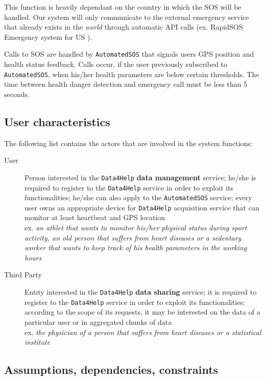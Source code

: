       This function is heavily dependant on the country in which the SOS will be handled. Our system will only communicate to the external emergency service that already exists in the \textit{world} through automatic API calls (ex. RapidSOS Emergency system for US \cite{sos}).

      Calls to SOS are handled by \texttt{AutomatedSOS} that signals users GPS position and health status feedback. Calls occur, if the user previously subscribed to \texttt{AutomatedSOS}, when his/her health parameters are below certain thresholds. The time between health danger detection and emergency call must be less than 5 seconds.

  \subsection{User characteristics}

    The following list contains the actors that are involved in the system functions:

      \begin{description}
        \item [User] Person interested in the \texttt{Data4Help} \textbf{data management} service; he/she is required to register to the \texttt{Data4Help} service in order to exploit its functionalities; he/she can also apply to the \texttt{AutomatedSOS} service; every user owns an appropriate device for \texttt{Data4Help} acquisition service that can monitor at least heartbeat and GPS location \\
        ex. \textit{an athlet that wants to monitor his/her physical status during sport activity, an old person that suffers from heart diseases or a sedentary worker that wants to keep track of his health parameters in the working hours}
        \item [Third Party] Entity interested in the \texttt{Data4Help} \textbf{data sharing} service; it is required to register to the \texttt{Data4Help} service in order to exploit its functionalities; according to the scope of its requests, it may be interested on the data of a particular user or in aggregated chunks of data \\
        ex. \textit{the physician of a person that suffers from heart diseases or a statistical institute}
      \end{description}

  \subsection{Assumptions, dependencies, constraints}

